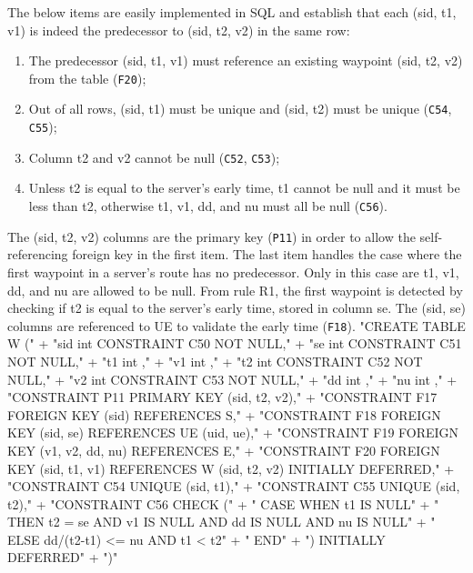 \documentclass{article}
\def\nwendcode{\endtrivlist \endgroup}
\let\nwdocspar=\par
\theoremstyle{definition}
\begin{document}
The below items are easily implemented in SQL and establish that each
(\textsf{sid}, \textsf{t1}, \textsf{v1}) is indeed the predecessor to
(\textsf{sid}, \textsf{t2}, \textsf{v2}) in the same row:
\begin{enumerate}
\item The predecessor (\textsf{sid}, \textsf{t1}, \textsf{v1}) must reference
an existing waypoint (\textsf{sid}, \textsf{t2}, \textsf{v2}) from the table
({\tt{}F20});
\item Out of all rows, (\textsf{sid}, \textsf{t1}) must be unique and
(\textsf{sid}, \textsf{t2}) must be unique ({\tt{}C54}, {\tt{}C55});
\item Column \textsf{t2} and \textsf{v2} cannot be null ({\tt{}C52}, {\tt{}C53});
\item Unless \textsf{t2} is equal to the server's early time, \textsf{t1}
cannot be null and it must be less than \textsf{t2}, otherwise \textsf{t1},
\textsf{v1}, \textsf{dd}, and \textsf{nu} must all be null ({\tt{}C56}).
\end{enumerate}
The (\textsf{sid}, \textsf{t2}, \textsf{v2}) columns are the primary key
({\tt{}P11}) in order to allow the self-referencing foreign key in the first item.
The last item handles the case where the first waypoint in a server's route has
no predecessor. Only in this case are \textsf{t1}, \textsf{v1}, \textsf{dd},
and \textsf{nu} are allowed to be null.  From rule R1, the first waypoint is
detected by checking if \textsf{t2} is equal to the server's early time, stored
in column \textsf{se}. The (\textsf{sid}, \textsf{se}) columns are referenced
to UE to validate the early time ({\tt{}F18}).
\nwenddocs{}\endmoddef{}
"CREATE TABLE W ("
  + "sid int  CONSTRAINT C50 NOT NULL,"
  + "se  int  CONSTRAINT C51 NOT NULL,"
  + "t1  int  ,"
  + "v1  int  ,"
  + "t2  int  CONSTRAINT C52 NOT NULL,"
  + "v2  int  CONSTRAINT C53 NOT NULL,"
  + "dd  int ,"
  + "nu  int ,"
  + "CONSTRAINT P11 PRIMARY KEY (sid, t2, v2),"
  + "CONSTRAINT F17 FOREIGN KEY (sid) REFERENCES S,"
  + "CONSTRAINT F18 FOREIGN KEY (sid, se) REFERENCES UE (uid, ue),"
  + "CONSTRAINT F19 FOREIGN KEY (v1, v2, dd, nu) REFERENCES E,"
  + "CONSTRAINT F20 FOREIGN KEY (sid, t1, v1) REFERENCES W (sid, t2, v2) INITIALLY DEFERRED,"
  + "CONSTRAINT C54 UNIQUE (sid, t1),"
  + "CONSTRAINT C55 UNIQUE (sid, t2),"
  + "CONSTRAINT C56 CHECK ("
  + "  CASE WHEN t1 IS NULL"
  + "    THEN t2 = se AND v1 IS NULL AND dd IS NULL AND nu IS NULL"
  + "    ELSE dd/(t2-t1) <= nu AND t1 < t2"
  + "  END"
  + ") INITIALLY DEFERRED"
  + ")"
\nwendcode{}\nwdocspar
\end{document}
